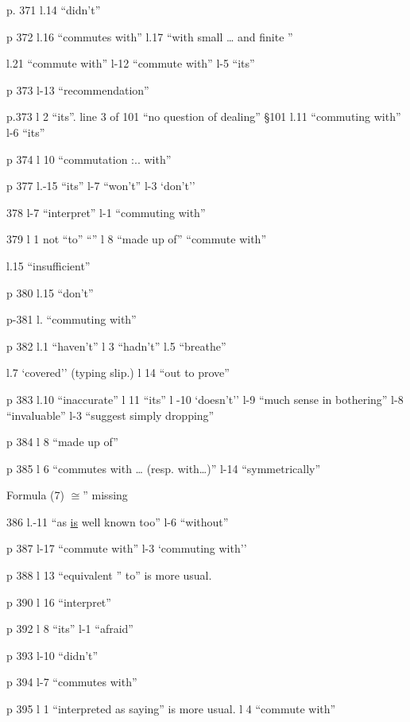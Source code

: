 
p. 371 l.14 ``didn't''

p 372 l.16 ``commutes with'' \quad l.17 ``with small \ldots{} and finite ''

l.21 ``commute with'' \quad l-12 ``commute with'' \quad l-5 ``its''

p 373 l-13 ``recommendation''

p.373 l 2 ``its''. \quad line 3 of 101 ``no question of dealing'' \quad \S101 l.11 ``commuting with'' \quad l-6 ``its''

p 374 l 10 ``commutation :.. with''

p 377 l.-15 ``its'' \quad l-7 ``won't'' \quad l-3 `don't''

378 l-7 ``interpret'' \quad l-1 ``commuting with''

379 l 1 not ``to'' ``'' \quad l 8 ``made up of'' \quad ``commute with''

l.15 ``insufficient''

p 380 l.15 ``don't''

p-381 l. ``commuting with''

p 382 l.1 ``haven't'' \quad l 3 ``hadn't'' \quad l.5 ``breathe''

l.7 `covered'' (typing slip.) \quad l 14 ``out to prove''

p 383 l.10 ``inaccurate'' \quad l 11 ``its'' \quad l -10 `doesn't'' \quad l-9 ``much sense in bothering'' \quad l-8 ``invaluable'' \quad l-3 ``suggest simply dropping''

p 384 l 8 ``made up of''

p 385 l 6 ``commutes with \ldots{} (resp. with\ldots{})'' \quad l-14 ``symmetrically''

Formula (7) $\cong$'' missing

386 l.-11 ``as \uline{is} well known too'' \quad l-6 ``without''

p 387 l-17 ``commute with'' \quad l-3 `commuting with''

p 388 l 13 ``equivalent '' to'' is more usual.

p 390 l 16 ``interpret''

p 392 l 8 ``its'' \quad l-1 ``afraid''

p 393 l-10 ``didn't''

p 394 l-7 ``commutes with''

p 395 l 1 ``interpreted as saying'' is more usual. \quad l 4 ``commute with''

